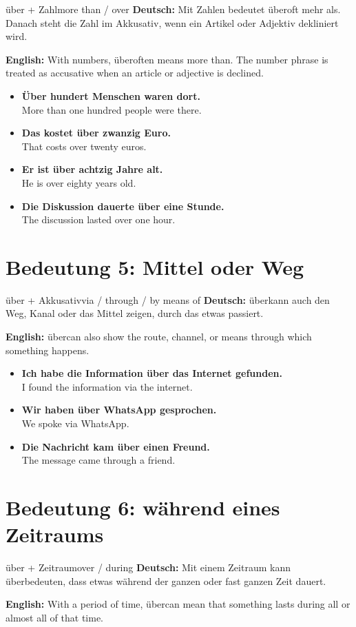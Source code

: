\documentclass[a4paper,11pt]{article}
\newcommand{\GermanText}[1]{\textbf{Deutsch: }#1\par}
\newcommand{\EnglishText}[1]{{\small\color{SoftGray}\textbf{English: }#1\par}}
\newcommand{\ExampleItem}[2]{\item \textbf{#1}\\{\small\color{SoftGray}#2}}
\begin{document}
\begin{grammarentry}{über + Zahl}{more than / over}
\GermanText{Mit Zahlen bedeutet \glqq über\grqq oft \glqq mehr als\grqq. Danach steht die Zahl im Akkusativ, wenn ein Artikel oder Adjektiv dekliniert wird.}
\EnglishText{With numbers, \glqq über\grqq often means \glqq more than\grqq. The number phrase is treated as accusative when an article or adjective is declined.}
\end{grammarentry}

\begin{exbox}
\begin{itemize}
    \ExampleItem{Über hundert Menschen waren dort.}{More than one hundred people were there.}
    \ExampleItem{Das kostet über zwanzig Euro.}{That costs over twenty euros.}
    \ExampleItem{Er ist über achtzig Jahre alt.}{He is over eighty years old.}
    \ExampleItem{Die Diskussion dauerte über eine Stunde.}{The discussion lasted over one hour.}
\end{itemize}
\end{exbox}

\section{Bedeutung 5: Mittel oder Weg}

\begin{grammarentry}{über + Akkusativ}{via / through / by means of}
\GermanText{\glqq über\grqq kann auch den Weg, Kanal oder das Mittel zeigen, durch das etwas passiert.}
\EnglishText{\glqq über\grqq can also show the route, channel, or means through which something happens.}
\end{grammarentry}

\begin{exbox}
\begin{itemize}
    \ExampleItem{Ich habe die Information über das Internet gefunden.}{I found the information via the internet.}
    \ExampleItem{Wir haben über WhatsApp gesprochen.}{We spoke via WhatsApp.}
    \ExampleItem{Die Nachricht kam über einen Freund.}{The message came through a friend.}
\end{itemize}
\end{exbox}

\section{Bedeutung 6: während eines Zeitraums}

\begin{grammarentry}{über + Zeitraum}{over / during}
\GermanText{Mit einem Zeitraum kann \glqq über\grqq bedeuten, dass etwas während der ganzen oder fast ganzen Zeit dauert.}
\EnglishText{With a period of time, \glqq über\grqq can mean that something lasts during all or almost all of that time.}
\end{grammarentry}
\end{document}
